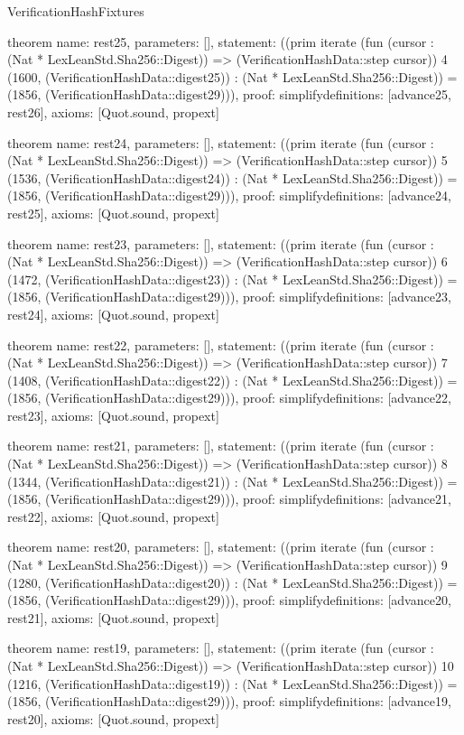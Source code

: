 \begin{lexlean}{VerificationHashFixtures}
\begin{semanticmodule}
theorem{
  name: rest25,
  parameters: [],
  statement: ((prim iterate (fun (cursor : (Nat * LexLeanStd.Sha256::Digest)) => (VerificationHashData::step cursor)) 4 (1600, (VerificationHashData::digest25)) : (Nat * LexLeanStd.Sha256::Digest)) = (1856, (VerificationHashData::digest29))),
  proof: simplify{definitions: [advance25, rest26]},
  axioms: [Quot.sound, propext]
}

theorem{
  name: rest24,
  parameters: [],
  statement: ((prim iterate (fun (cursor : (Nat * LexLeanStd.Sha256::Digest)) => (VerificationHashData::step cursor)) 5 (1536, (VerificationHashData::digest24)) : (Nat * LexLeanStd.Sha256::Digest)) = (1856, (VerificationHashData::digest29))),
  proof: simplify{definitions: [advance24, rest25]},
  axioms: [Quot.sound, propext]
}

theorem{
  name: rest23,
  parameters: [],
  statement: ((prim iterate (fun (cursor : (Nat * LexLeanStd.Sha256::Digest)) => (VerificationHashData::step cursor)) 6 (1472, (VerificationHashData::digest23)) : (Nat * LexLeanStd.Sha256::Digest)) = (1856, (VerificationHashData::digest29))),
  proof: simplify{definitions: [advance23, rest24]},
  axioms: [Quot.sound, propext]
}

theorem{
  name: rest22,
  parameters: [],
  statement: ((prim iterate (fun (cursor : (Nat * LexLeanStd.Sha256::Digest)) => (VerificationHashData::step cursor)) 7 (1408, (VerificationHashData::digest22)) : (Nat * LexLeanStd.Sha256::Digest)) = (1856, (VerificationHashData::digest29))),
  proof: simplify{definitions: [advance22, rest23]},
  axioms: [Quot.sound, propext]
}

theorem{
  name: rest21,
  parameters: [],
  statement: ((prim iterate (fun (cursor : (Nat * LexLeanStd.Sha256::Digest)) => (VerificationHashData::step cursor)) 8 (1344, (VerificationHashData::digest21)) : (Nat * LexLeanStd.Sha256::Digest)) = (1856, (VerificationHashData::digest29))),
  proof: simplify{definitions: [advance21, rest22]},
  axioms: [Quot.sound, propext]
}

theorem{
  name: rest20,
  parameters: [],
  statement: ((prim iterate (fun (cursor : (Nat * LexLeanStd.Sha256::Digest)) => (VerificationHashData::step cursor)) 9 (1280, (VerificationHashData::digest20)) : (Nat * LexLeanStd.Sha256::Digest)) = (1856, (VerificationHashData::digest29))),
  proof: simplify{definitions: [advance20, rest21]},
  axioms: [Quot.sound, propext]
}

theorem{
  name: rest19,
  parameters: [],
  statement: ((prim iterate (fun (cursor : (Nat * LexLeanStd.Sha256::Digest)) => (VerificationHashData::step cursor)) 10 (1216, (VerificationHashData::digest19)) : (Nat * LexLeanStd.Sha256::Digest)) = (1856, (VerificationHashData::digest29))),
  proof: simplify{definitions: [advance19, rest20]},
  axioms: [Quot.sound, propext]
}


\end{semanticmodule}
\end{lexlean}
